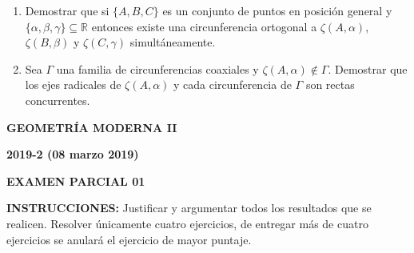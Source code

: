 \documentclass[12pt]{report}
\newcommand{\R}{\mathbb R}
\begin{document}
\begin{enumerate}
\item Demostrar que si $\{A,B,C\}$ es un conjunto de puntos en posición general y $\{\alpha, \beta,\gamma\} \subseteq \R$ entonces existe una circunferencia ortogonal a $\zeta(A,\alpha)$, $\zeta(B,\beta)$ y $\zeta(C,\gamma)$ simultáneamente.

\item Sea $\Gamma$ una familia de circunferencias coaxiales y $\zeta(A, \alpha) \notin \Gamma$. Demostrar que los ejes radicales de $\zeta (A, \alpha)$ y cada circunferencia de $\Gamma$ son rectas concurrentes.



\end{enumerate}

\vspace{2cm}


\begin{center}
\textbf{\LARGE {GEOMETRÍA MODERNA II}}
\end{center}

\begin{center}
\textbf{{\large 2019-2 (08 marzo 2019)}}
\end{center}

\begin{center}
\textbf{{\large EXAMEN PARCIAL 01}}
\end{center}

{\bf INSTRUCCIONES:} Justificar y argumentar todos los resultados que se realicen. Resolver únicamente cuatro ejercicios, de entregar más de cuatro ejercicios se anulará el ejercicio de mayor puntaje.
\end{document}
